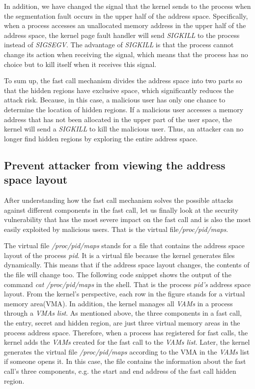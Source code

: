 In addition, we have changed the signal that the kernel 
sends to the process when the segmentation fault occurs 
in the upper half of the address space. Specifically, 
when a process accesses an unallocated memory address 
in the upper half of the address space, the kernel page 
fault handler will send \emph{SIGKILL}\cite{21} to the process instead 
of \emph{SIGSEGV}. The advantage of \emph{SIGKILL} is that the process 
cannot change its action when receiving the signal, which means 
that the process has no choice but to kill itself 
when it receives this signal.

To sum up, the fast call mechanism divides the address space 
into two parts so that the hidden regions have exclusive space,
which significantly reduces the attack risk. Because, in this 
case, a malicious user has only one chance to determine the 
location of hidden regions.  If a malicious user accesses a 
memory address that has not been allocated in the upper part
of the user space, the kernel will send a \emph{SIGKILL} to kill 
the malicious user. Thus, an attacker can no longer find hidden 
regions by exploring the entire address space.


\subsection{Prevent attacker from viewing the address space layout}

After understanding how the fast call mechanism solves the possible attacks 
against different components in the fast call, let us finally look at the security 
vulnerability that has the most severe impact on the fast call and is also the most 
easily exploited by malicious users. That is the virtual file\emph{/proc/pid/maps}\cite{23}. 

The virtual file \emph{/proc/pid/maps} stands for a file that contains the address 
space layout of the process \emph{pid}. It is a virtual file because the kernel generates 
files dynamically. This means that if the address space layout changes, the contents 
of the file will change too. The following code snippet shows the output of the 
command  \emph{cat /proc/pid/maps} in the shell. That is the process \emph{pid’s} address space layout. 
From the kernel’s perspective, each row in the figure stands for a virtual memory area(VMA). 
In addition, the kernel manages all \emph{VAMs}\cite{10.5555/983550} in a process through a \emph{VMAs list}. As mentioned above, 
the three components in a fast call, the entry, secret and hidden region, are just three 
virtual memory areas in the process address space. Therefore, when a process has registered 
for fast calls, the kernel adds the \emph{VAMs} created for the fast call to the \emph{VAMs list}. 
Later, the kernel generates the virtual file \emph{/proc/pid/maps} according to the VMA in the 
\emph{VAMs} list if someone opens it. In this case, the file contains the information about 
the fast call's three components, e.g. the start and end address of the fast call hidden region. 

